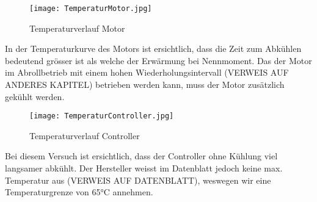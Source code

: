 \begin{figure}[H]
	\centering
	\texttt{[image: TemperaturMotor.jpg]}
	\caption{Temperaturverlauf Motor}\label{fig:TemperaturMotor}
\end{figure}

In der Temperaturkurve des Motors ist ersichtlich, dass die Zeit zum Abkühlen bedeutend grösser ist als welche der Erwärmung bei Nennmoment. Das der Motor im Abrollbetrieb mit einem hohen Wiederholungsintervall (VERWEIS AUF ANDERES KAPITEL) betrieben werden kann, muss der Motor zusätzlich gekühlt werden.

\begin{figure}[H]
	\centering
	\texttt{[image: TemperaturController.jpg]}
	\caption{Temperaturverlauf Controller}\label{fig:TemperaturController}
\end{figure}

Bei diesem Versuch ist ersichtlich, dass der Controller ohne Kühlung viel langsamer abkühlt. Der Hersteller weisst im Datenblatt jedoch keine max. Temperatur aus (VERWEIS AUF DATENBLATT), weswegen wir eine Temperaturgrenze von 65°C annehmen.